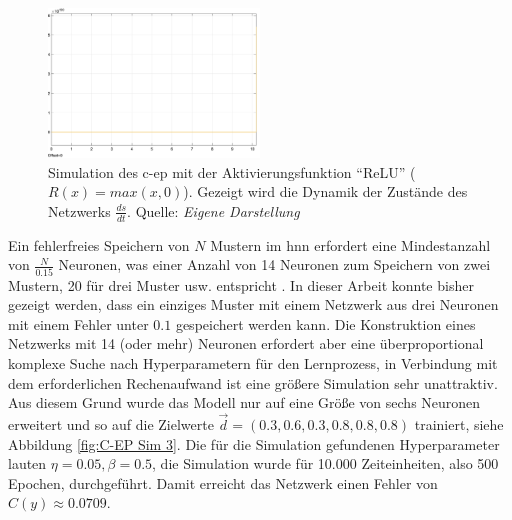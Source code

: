\begin{figure}[h]
  \centering
  \includegraphics[width=0.5\textwidth]{abbildungen/c_ep_sim_7_state_dynamics.png}
  \caption{Simulation des \ac{c-ep} mit der Aktivierungsfunktion "`ReLU"' (\(R(x)=max(x,0)\)). Gezeigt wird die Dynamik der Zustände des Netzwerks \(\frac{ds}{dt}\). Quelle: \textit{Eigene Darstellung}}
  \label{fig:C-EP Sim 7}
\end{figure}

Ein fehlerfreies Speichern von \(N\) Mustern im \ac{hnn} erfordert eine Mindestanzahl von \(\frac{N}{0.15}\) Neuronen, was einer Anzahl von 14 Neuronen zum Speichern von zwei Mustern, 20 für drei Muster usw. entspricht \cite[vgl. S. 2556]{Hopfield1982}. In dieser Arbeit konnte bisher gezeigt werden, dass ein einziges Muster mit einem Netzwerk aus drei Neuronen mit einem Fehler unter \(0.1\) gespeichert werden kann. Die Konstruktion eines Netzwerks mit 14 (oder mehr) Neuronen erfordert aber eine überproportional komplexe Suche nach Hyperparametern für den Lernprozess, in Verbindung mit dem erforderlichen Rechenaufwand ist eine größere Simulation sehr unattraktiv. Aus diesem Grund wurde das Modell nur auf eine Größe von sechs Neuronen erweitert und so auf die Zielwerte \(\vec{d}=(0.3,0.6,0.3,0.8,0.8,0.8)\) trainiert, siehe Abbildung \ref{fig:C-EP Sim 3}. Die für die Simulation gefundenen Hyperparameter lauten \(\eta=0.05,\beta=0.5\), die Simulation wurde für 10.000 Zeiteinheiten, also 500 Epochen, durchgeführt. Damit erreicht das Netzwerk einen Fehler von \(C(y)\approx0.0709\).

